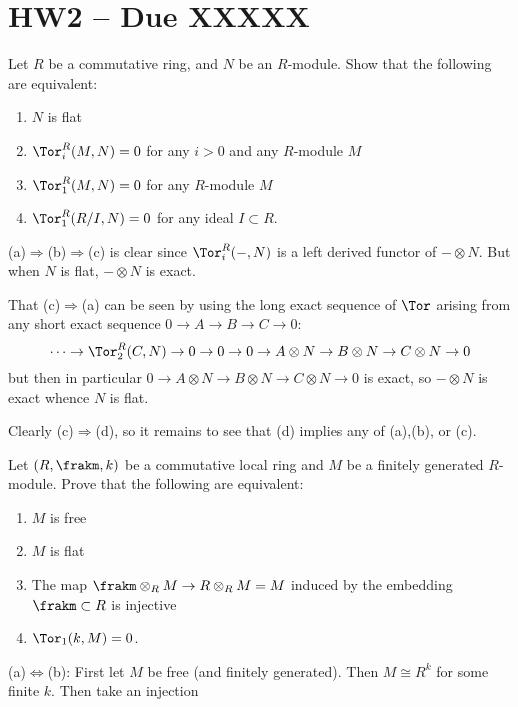 \documentclass[12pt]{article}
\begin{document}

\newpage
\section{HW2 -- Due XXXXX}
\begin{prob}
	Let $R$ be a commutative ring, and $N$ be an $R$-module. Show that the following are equivalent:
	\begin{enumerate}
		\item $N$ is flat 
		\item $\Tor_i^R(M,N) = 0$ for any $i>0$ and any $R$-module $M$
		\item $\Tor_1^R(M,N) = 0$ for any $R$-module $M$
		\item $\Tor_1^R(R/I, N) = 0$ for any ideal $I \subset R$.
	\end{enumerate}
\end{prob}
\begin{sol}
	(a)$\Rightarrow$(b)$\Rightarrow$(c) is clear since $\Tor_i^R(-,N)$ is a left derived functor of $-\otimes N$. But when $N$ is flat, $-\otimes N$ is exact.

	That (c)$\Rightarrow$(a) can be seen by using the long exact sequence of $\Tor$ arising from any short exact sequence $0\to A\to B\to C\to 0$:
	\[\cdots\to\Tor_2^R(C,N)\to 0\to 0\to 0\to A\otimes N\to B\otimes N\to C\otimes N\to 0\]
	but then in particular $0\to A\otimes N\to B\otimes N\to C\otimes N\to 0$ is exact, so $-\otimes N$ is exact whence $N$ is flat.

	Clearly (c)$\Rightarrow$(d), so it remains to see that (d) implies any of (a),(b), or (c).

\end{sol}

\begin{prob}
	Let $(R, \frakm, k)$ be a commutative local ring and $M$ be a finitely generated $R$-module. Prove that the following are equivalent: 
	\begin{enumerate}
		\item $M$ is free
		\item $M$ is flat
		\item The map $\frakm \otimes_R M \to R \otimes_R M =M$ induced by the embedding $\frakm \subset R$ is injective
		\item $\Tor_1(k,M)=0$.
	\end{enumerate}
\end{prob}
\begin{sol}
	(a)$\Leftrightarrow$(b): First let $M$ be free (and finitely generated). Then $M\cong R^k$ for some finite $k$. 
	Then take an injection
\end{sol}
\end{document}
